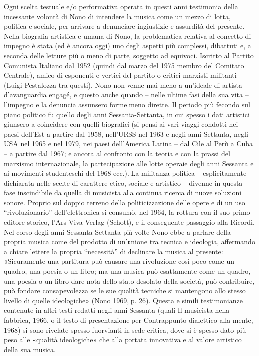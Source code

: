 Ogni scelta testuale e/o performativa operata in questi anni testimonia della incessante volontà di Nono di intendere la musica come un mezzo di lotta, politica e sociale, per arrivare a denunciare ingiustizie e assurdità del presente. Nella biografia artistica e umana di Nono, la problematica relativa al concetto di impegno è stata (ed è ancora oggi) uno degli aspetti più complessi, dibattuti e, a seconda delle letture più o meno di parte, soggetto ad equivoci. Iscritto al Partito Comunista Italiano dal 1952 (quindi dal marzo del 1975 membro del Comitato Centrale), amico di esponenti e vertici del partito o critici marxisti militanti (Luigi Pestalozza tra questi), Nono non venne mai meno a un’ideale di artista d’avanguardia engagé, e questo anche quando – nelle ultime fasi della sua vita – l’impegno e la denuncia assunsero forme meno dirette. Il periodo più fecondo sul piano politico fu quello degli anni Sessanta-Settanta, in cui spesso i dati artistici giunsero a coincidere con quelli biografici (si pensi ai vari viaggi condotti nei paesi dell’Est a partire dal 1958, nell’URSS nel 1963 e negli anni Settanta, negli USA nel 1965 e nel 1979, nei paesi dell’America Latina – dal Cile al Perù a Cuba – a partire dal 1967; e ancora al confronto con la teoria e con la prassi del marxismo internazionale, la partecipazione alle lotte operaie degli anni Sessanta e ai movimenti studenteschi del 1968 ecc.). La militanza politica – esplicitamente dichiarata nelle scelte di carattere etico, sociale e artistico – divenne in questa fase inscindibile da quella di musicista alla continua ricerca di nuove soluzioni sonore. Proprio sul doppio terreno della politicizzazione delle opere e di un uso “rivoluzionario” dell’elettronica si consumò, nel 1964, la rottura con il suo primo editore storico, l’Ars Viva Verlag (Schott), e il conseguente passaggio alla Ricordi. Nel corso degli anni Sessanta-Settanta più volte Nono ebbe a parlare della propria musica come del prodotto di un’unione tra tecnica e ideologia, affermando a chiare lettere la propria “necessità” di declinare la musica al presente: «Sicuramente una partitura può causare una rivoluzione così poco come un quadro, una poesia o un libro; ma una musica può esattamente come un quadro, una poesia o un libro dare nota dello stato desolato della società, può contribuire, può fondare consapevolezza se le sue qualità tecniche si mantengono allo stesso livello di quelle ideologiche» (Nono 1969, p. 26). Questa e simili testimonianze contenute in altri testi redatti negli anni Sessanta (quali Il musicista nella fabbrica, 1966, o il testo di presentazione per Contrappunto dialettico alla mente, 1968) si sono rivelate spesso fuorvianti in sede critica, dove si è spesso dato più peso alle «qualità ideologiche» che alla portata innovativa e al valore artistico della sua musica.

